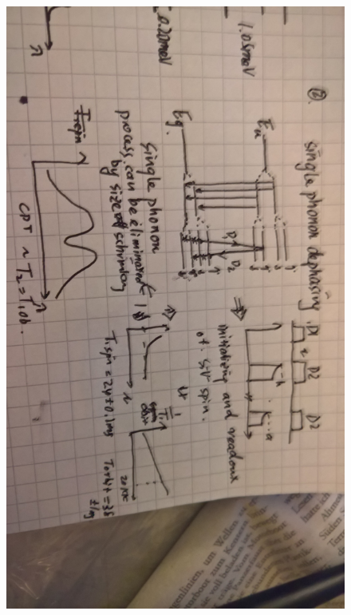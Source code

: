 \begin{figure}[h]
\centering
\includegraphics[width=1\linewidth]{Figures/pic/WP_20160921_20_40_32_Pro_LI}
\caption{}
\label{fig:wp20160921204032proli}
\end{figure}
\FloatBarrier



